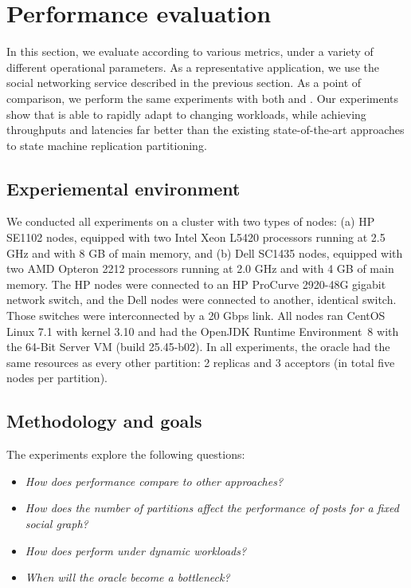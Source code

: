 \section{Performance evaluation}
\label{sec:experiments}

In this section, we evaluate \dynastar{} according to various metrics,
under a variety of different operational parameters.  As a
representative application, we use the \appname{} social networking
service described in the previous section.  As a point of comparison,
we perform the same experiments with both
\ssmr{} and \dssmr. Our experiments show that
\dynastar{} is able to rapidly adapt to changing workloads, while
achieving throughputs and latencies far better than the existing
state-of-the-art approaches to state machine replication partitioning.


\subsection{Experiemental environment}
\label{sec:evaluation:setup}

We conducted all experiments on a cluster with two types of nodes: (a)
HP SE1102 nodes, equipped with two Intel Xeon L5420 processors running
at 2.5 GHz and with 8 GB of main memory, and (b) Dell SC1435 nodes,
equipped with two AMD Opteron 2212 processors running at 2.0 GHz and
with 4 GB of main memory. The HP nodes were connected to an HP
ProCurve 2920-48G gigabit network switch, and the Dell nodes were
connected to another, identical switch. Those switches were
interconnected by a 20 Gbps link.  All nodes ran CentOS Linux 7.1 with
kernel 3.10 and had the OpenJDK Runtime Environment~8 with the
\mbox{64-Bit} Server VM (build 25.45-b02). In all experiments, the oracle 
had the same resources as every other partition: 2 replicas and 3 acceptors 
(in total five nodes per partition).


\subsection{Methodology and goals}
\label{sec:evaluation:methodology}

The experiments explore the following questions:
\begin{itemize}
\item \emph{How does \dynastar performance compare to other approaches?} 
\item \emph{How does the number of partitions affect the performance of posts for a fixed social graph?}
\item \emph{How does \dynastar perform under dynamic workloads?}
\item \emph{When will the oracle become a bottleneck?}
\end{itemize}



